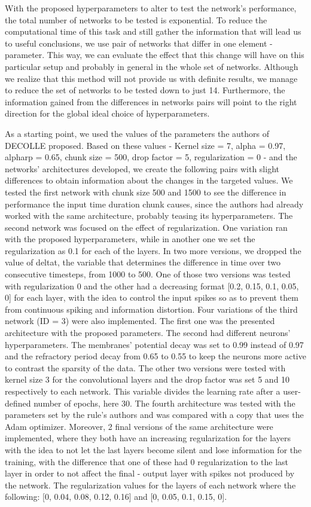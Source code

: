 \documentclass[12pt]{report}
\begin{document}
With the proposed hyperparameters to alter to test the network's performance, the total number of networks to be tested is exponential. To reduce the computational time of this task and still gather the information that will lead us to useful conclusions, we use pair of networks that differ in one element - parameter. This way, we can evaluate the effect that this change will have on this particular setup and probably in general in the whole set of networks. Although we realize that this method will not provide us with definite results, we manage to reduce the set of networks to be tested down to just 14. Furthermore, the information gained from the differences in networks pairs will point to the right direction for the global ideal choice of hyperparameters.

As a starting point, we used the values of the parameters the authors of DECOLLE proposed. Based on these values - Kernel size = 7, alpha = 0.97, alpharp = 0.65, chunk size = 500, drop factor = 5, regularization = 0 - and the networks' architectures developed, we create the following pairs with slight differences to obtain information about the changes in the targeted values. We tested the first network with chunk size 500 and 1500 to see the difference in performance the input time duration chunk causes, since the authors had already worked with the same architecture, probably teasing its hyperparameters. The second network was focused on the effect of regularization. One variation ran with the proposed hyperparameters, while in another one we set the regularization as 0.1 for each of the layers. In two more versions, we dropped the value of deltat, the variable that determines the difference in time over two consecutive timesteps, from 1000 to 500. One of those two versions was tested with regularization 0 and the other had a decreasing format [0.2, 0.15, 0.1, 0.05, 0] for each layer, with the idea to control the input spikes so as to prevent them from continuous spiking and information distortion. Four variations of the third network (ID = 3) were also implemented. The first one was the presented architecture with the proposed parameters. The second had different neurons' hyperparameters. The membranes' potential decay was set to 0.99 instead of 0.97 and the refractory period decay from  0.65 to 0.55 to keep the neurons more active to contrast the sparsity of the data. The other two versions were tested with kernel size 3 for the convolutional layers and the drop factor was set 5 and 10 respectively to each network. This variable divides the learning rate after a user-defined number of epochs, here 30. The fourth architecture was tested with the parameters set by the rule's authors and was compared with a copy that uses the Adam optimizer. Moreover, 2 final versions of the same architecture were implemented, where they both have an increasing regularization for the layers with the idea to not let the last layers become silent and lose information for the training, with the difference that one of these had 0 regularization to the last layer in order to not affect the final - output layer with spikes not produced by the network. The regularization values for the layers of each network where the following: [0, 0.04, 0.08, 0.12, 0.16] and [0, 0.05, 0.1, 0.15, 0].
\end{document}
